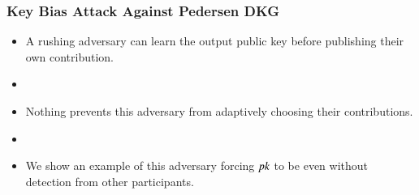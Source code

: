 \documentclass[hyperref={pdfpagelabels=true},table,dvipsnames,14pt,aspectratio=169]{beamer}
\begin{document}
\begin{frame}
  \centering
{}
\end{frame}

\begin{frame}
  \frametitle{Key Bias Attack Against Pedersen DKG}

  \begin{itemize}
    \item<1-> A rushing adversary can learn the output public key before publishing their own contribution.
    \item[]
    \item<2-> Nothing prevents this adversary from adaptively choosing their contributions.
    \item[]
    \item<3-> We show an example of this adversary forcing $\mathit{pk}$ to be even without detection from other participants.
  \end{itemize}
\end{frame}
\end{document}

